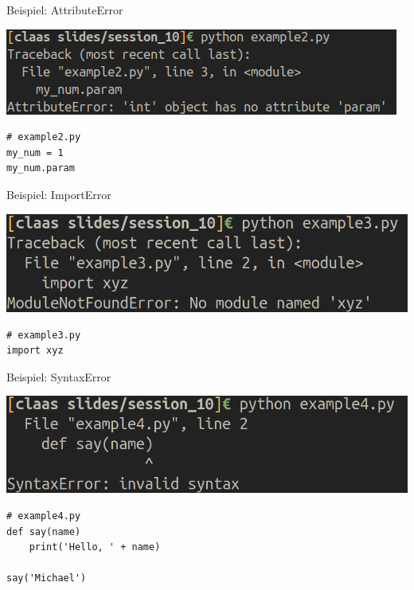 \begin{frame}[fragile]{Beispiel: AttributeError}
\begin{center}
    \includegraphics[width=\textwidth]{stack_trace_attribute_error.png}
\end{center}
\begin{lstlisting}
# example2.py
my_num = 1
my_num.param
\end{lstlisting}
\end{frame}

\begin{frame}[fragile]{Beispiel: ImportError}
\begin{center}
    \includegraphics[width=\textwidth]{stack_trace_import_error.png}
\end{center}
\begin{lstlisting}
# example3.py
import xyz
\end{lstlisting}
\end{frame}

\begin{frame}[fragile]{Beispiel: SyntaxError}
\begin{center}
    \includegraphics[width=\textwidth]{stack_trace_syntax_error.png}
\end{center}

\begin{lstlisting}
# example4.py
def say(name)
    print('Hello, ' + name)

say('Michael')
\end{lstlisting}
\end{frame}

